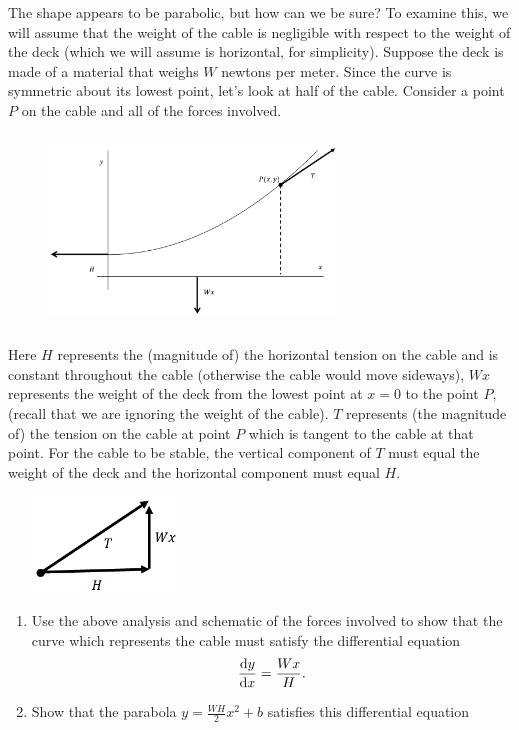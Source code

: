 The shape appears to be parabolic, but how can we be sure?  To examine
this, we will assume that the weight of the cable is negligible with
respect to the weight of the deck (which we will assume is horizontal,
for simplicity).  Suppose the deck is made of a material that weighs $W$
newtons per meter.  Since the curve is symmetric about its lowest
point, let's look at half of the cable.  Consider a point $P$ on the
cable and all of the forces involved. 
\begin{figure}
\captionsetup{labelformat=empty}
\centerline{\includegraphics*[height=2in,width=3in]{Figures/MackinacBridge2}}
\label{fig:}
\end{figure}

Here $H$ represents the (magnitude of) the horizontal tension on the
cable and is constant throughout the cable (otherwise the cable would
move sideways), $Wx$ represents the weight of the deck from the lowest
point at $x=0$ to the point $P,$ (recall that we are ignoring the weight
of the cable).  $T$ represents (the magnitude of) the tension on the
cable at point $P$ which is tangent to the cable at that point.  For the
cable to be stable, the vertical component of $T$ must equal the weight
of the deck and the horizontal component must equal $H.$

\begin{embeddedproblem}{}
\centerline{\includegraphics*[height=1in,width=2in]{Figures/MackinacBridge3}}
    \begin{enumerate}[label={\bf{}(\alph*)}]
    \item Use the above analysis and  schematic of the
      forces involved
to show that the curve which
      represents the cable must satisfy the differential equation
       $$\frac{\text{d}{y}}{\text{d}{x}}=\frac{Wx}{H}.$$
    \item Show that the parabola  $y=\frac{WH}{2} x^2+b$  satisfies this differential equation
    \end{enumerate}
\end{embeddedproblem}

